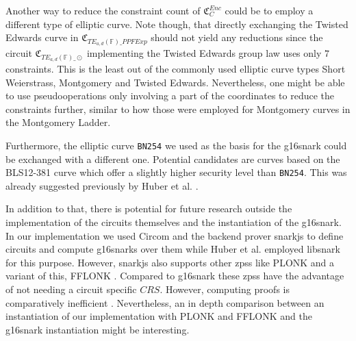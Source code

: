 Another way to reduce the constraint count of $\mathfrak{C}_C^{Enc}$ could be to employ a different type of elliptic curve.
Note though, that directly exchanging the Twisted Edwards curve in $\mathfrak{C}_{TE_{a,d}(\mathbb{F})\_PPFExp}$ should not yield any reductions since the circuit $\mathfrak{C}_{TE_{a,d}(\mathbb{F})\_\odot}$ implementing the Twisted Edwards group law uses only $7$ constraints.
This is the least out of the commonly used elliptic curve types Short Weierstrass, Montgomery and Twisted Edwards.
Nevertheless, one might be able to use pseudooperations only involving a part of the coordinates to reduce the constraints further, similar to how those were employed for Montgomery curves in the Montgomery Ladder.

Furthermore, the elliptic curve \verb|BN254| we used as the basis for the \gls{g16snark} could be exchanged with a different one.
Potential candidates are curves based on the BLS12-381 curve \cite{barreto_constructing_2002, sean_bowe_bls12-381_2017} which offer a slightly higher security level than \verb|BN254|.
This was already suggested previously by Huber et al. \cite{huber_zk-snarks_2025}.

In addition to that, there is potential for future research outside the implementation of the circuits themselves and the instantiation of the \gls{g16snark}.
In our implementation we used Circom and the backend prover snarkjs to define circuits and compute \glspl{g16snark} over them while Huber et al. employed libsnark for this purpose.
However, snarkjs also supports other \glspl{zps} like PLONK and a variant of this, FFLONK \cite{gabizon_plonk_2019, gabizon_fflonk_2021}.
Compared to \gls{g16snark} these \glspl{zps} have the advantage of not needing a circuit specific $CRS$.
However, computing proofs is comparatively inefficient \cite{gabizon_plonk_2019,gabizon_fflonk_2021}. %
Nevertheless, an in depth comparison between an instantiation of our implementation with PLONK and FFLONK and the \gls{g16snark} instantiation might be interesting.

